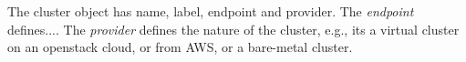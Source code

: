The cluster object has name, label, endpoint and provider. The \textit{endpoint}
defines.... The \textit{provider} defines the nature of the cluster,
e.g., its a virtual cluster on an openstack cloud, or from AWS, or a bare-metal
cluster.
